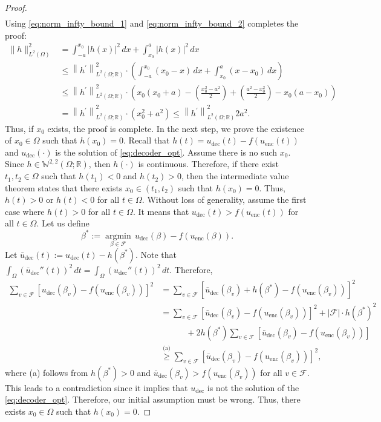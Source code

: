 \documentclass{article}
\def\encs{u_\textrm{enc}}
\def\decs{u_\textrm{dec}}
\def\decsbar{\bar{u}_\textrm{dec}}
\def\stset{\mathcal{F}}
\newcommand{\lp}[1]{{L}^{#1}\left(\Omega; \mathbb{R}\right)}
\newcommand{\sob}[2]{\mathbb{W}^{#1,#2}\left(\Omega; \mathbb{R}\right)}
\newcommand{\lec}[2]{\stackrel{\text{#1}}{#2}}
\begin{document}
\begin{proof}
\begin{align}
\end{align}
Using \eqref{eq:norm_infty_bound_1} and \eqref{eq:norm_infty_bound_2} completes the proof:
\begin{align}
\|h\|_{L^{2}(\Omega)}^{2}&=\int_{-a}^{x_{0}}|h(x)|^{2}\,dx+\int_{x_{0}}^{a}|h(x)|^{2} \,dx \nonumber \\ 
&\leqslant\left\|h^{\prime}\right\|_{\lp{2}}^{2} \cdot \left(\int_{-a}^{x_{0}}\left(x_{0}-x\right)\,dx+\int_{x_{0}}^{a}\left(x-x_{0}\right)\,dx\right) \nonumber \\
&\leqslant\left\|h^{\prime}\right\|_{\lp{2}}^{2} \cdot\left(x_{0}\left(x_{0}+a\right)-\left(\frac{x_{0}^{2}-a^2}{2}\right)+\left(\frac{a^{2}-x_{0}^{2}}{2}\right)-x_{0}\left(a-x_{0}\right)\right) \\
&= \left\|h^{\prime}\right\|_{\lp{2}}^{2} \cdot\left(x_{0}^{2}+a^{2}\right) \leqslant\left\|h^{\prime}\right\|^2_{\lp{2}} 2a^2.
\end{align}
Thus, if $x_0$ exists, the proof is complete. In the next step, we prove the existence of  $x_0\in\Omega$ such that $h\left(x_{0}\right)=0$. Recall that $h(t) = \decs(t) - f(\encs(t))$ and $\decs(\cdot)$ is the solution of \eqref{eq:decoder_opt}. Assume there is no such $x_0$. Since $h \in \sob{2}{2}$, then $h(\cdot)$ is continuous. Therefore, if there exist $t_1,t_2 \in \Omega$ such that $h(t_1) < 0$ and $h(t_2) > 0$, then the intermediate value theorem states that there exists $x_0 \in (t_1, t_2)$ such that $h(x_0)=0$. Thus, $h(t) >0$ or $h(t)<0$ for all $t\in\Omega$. Without loss of generality, assume the first case where $h(t) > 0$ for all $t\in\Omega$. It means that $\decs(t) > f(\encs(t))$ for all $t\in\Omega$. Let us define $$\beta^* := \underset{\beta \in \stset}{\operatorname{argmin}}\, \decs(\beta) - f(\encs(\beta)).$$ 
Let $\decsbar(t) := \decs(t) - h(\beta^*)$. Note that $\int_\Omega \left(\decsbar''(t)\right)^2\,dt = \int_\Omega \left(\decs''(t)\right)^2\,dt$. Therefore, 
\begin{align}
    \sum_{v \in \stset}\left[\decs\left(\beta_v\right)-f\left(\encs\left(\beta_v\right)\right)\right]^2 &= \sum_{v \in \stset}\left[\decsbar \left(\beta_v\right) + h(\beta^*)-f\left(\encs\left(\beta_v\right)\right)\right]^2 \nonumber \\
    &= \sum_{v \in \stset}\left[\decsbar\left(\beta_v\right)-f\left(\encs\left(\beta_v\right)\right)\right]^2 + |\stset|\cdot h(\beta^*)^2 \nonumber \\
    &\quad\quad\quad + 2h(\beta^*) \sum_{v\in \stset}[\decsbar(\beta_v) - f(\encs(\beta_v))] \nonumber \\
    &\lec{(a)}{\geqslant} \sum_{v \in \stset} \left[\decsbar\left(\beta_v\right)-f\left(\encs\left(\beta_v\right)\right)\right]^2,
\end{align}
where (a) follows from $h(\beta^*) > 0$ and $\decsbar(\beta_v) > f(\encs(\beta_v))$ for all $v \in \stset$. This leads to a contradiction since it implies that $\decs$ is not the solution of the \eqref{eq:decoder_opt}. Therefore, our initial assumption must be wrong. Thus, there exists $x_0\in \Omega$ such that $h(x_0) = 0$.
\end{proof}
\end{document}
